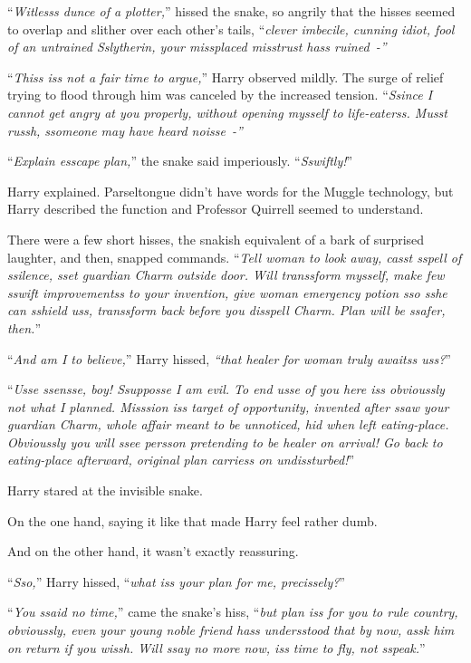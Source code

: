 ``\emph{Witlesss dunce of a plotter,}'' hissed the snake, so angrily that the hisses seemed to overlap and slither over each other's tails, ``\emph{clever imbecile, cunning idiot, fool of an untrained Sslytherin, your missplaced misstrust hass ruined~-''}

``\emph{Thiss iss not a fair time to argue,}'' Harry observed mildly. The surge of relief trying to flood through him was canceled by the increased tension. ``\emph{Ssince I cannot get angry at you properly, without opening mysself to life-eaterss. Musst russh, ssomeone may have heard noisse~-''}

``\emph{Explain esscape plan,}'' the snake said imperiously. ``\emph{Sswiftly!}''

Harry explained. Parseltongue didn't have words for the Muggle technology, but Harry described the function and Professor Quirrell seemed to understand.

There were a few short hisses, the snakish equivalent of a bark of surprised laughter, and then, snapped commands. ``\emph{Tell woman to look away, casst sspell of ssilence, sset guardian Charm outside door. Will transsform mysself, make few sswift improvementss to your invention, give woman emergency potion sso sshe can sshield uss, transsform back before you disspell Charm. Plan will be ssafer, then.}''

``\emph{And am I to believe,}'' Harry hissed, \emph{``that healer for woman truly awaitss uss?}''

``\emph{Usse ssensse, boy! Ssupposse I am evil. To end usse of you here iss obvioussly not what I planned. Misssion iss target of opportunity, invented after ssaw your guardian Charm, whole affair meant to be unnoticed, hid when left eating-place. Obvioussly you will ssee persson pretending to be healer on arrival! Go back to eating-place afterward, original plan carriess on undissturbed!}''

Harry stared at the invisible snake.

On the one hand, saying it like that made Harry feel rather dumb.

And on the other hand, it wasn't exactly reassuring.

``\emph{Sso,}'' Harry hissed, ``\emph{what iss your plan for me, precissely?}''

``\emph{You ssaid no time,}'' came the snake's hiss, ``\emph{but plan iss for you to rule country, obvioussly, even your young noble friend hass undersstood that by now, assk him on return if you wissh. Will ssay no more now, iss time to fly, not sspeak.}''

